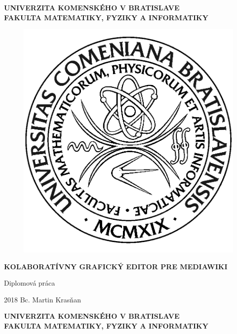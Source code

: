\documentclass[12pt, a4paper, oneside]{book}
\newcommand\mftitle{Kolaboratívny grafický editor pre MediaWiki}
\newcommand\mfthesistype{Diplomová práca}
\newcommand\mfauthor{Bc. Martin Krasňan}
\newcommand\mfuniversity{UNIVERZITA KOMENSKÉHO V BRATISLAVE}
\newcommand\mffaculty{FAKULTA MATEMATIKY, FYZIKY A INFORMATIKY}
\begin{document}
\frontmatter
\setcounter{page}{3}
\setcounter{secnumdepth}{2}

\thispagestyle{empty}

\noindent
\begin{minipage}{\textwidth}
\begin{center}
\textbf{\mfuniversity \\
\mffaculty}
\end{center}
\end{minipage}

\vfill
\begin{figure}[!hbt]
	\begin{center}
		\includegraphics{images/base/logo_fmph}
		\label{img:logo}
	\end{center}
\end{figure}
\begin{center}
	\begin{minipage}{0.8\textwidth}
		\centerline{\textbf{\Large\MakeUppercase{\mftitle}}}
		\smallskip
		\centerline{\mfthesistype}
	\end{minipage}
\end{center}
\vfill
2018 \hfill
\mfauthor
\eject 

\thispagestyle{empty}

\noindent
\begin{minipage}{\textwidth}
	\begin{center}
		\textbf{\mfuniversity \\
			\mffaculty}
	\end{center}
\end{minipage}
\end{document}
